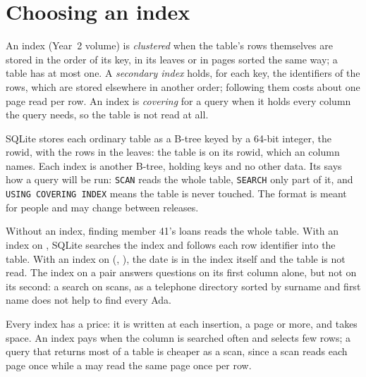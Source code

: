 \section{Choosing an index}\label{sec:b3:database-storage:choosing}

\begin{definition}\label{def:b3:database-storage:index}
An index (Year~2 volume) is \emph{clustered} when the table's rows themselves are stored in the order of its key, in its leaves or in pages sorted the same way; a table has at most one. A \emph{secondary index} holds, for each key, the identifiers of the rows, which are stored elsewhere in another order; following them costs about one page read per row. An index is \emph{covering} for a query when it holds every column the query needs, so the table is not read at all.
\end{definition}

SQLite stores each ordinary table as a B-tree keyed by a 64-bit integer, the rowid, with the rows in the leaves: the table is  on its rowid, which an  column names. Each index is another B-tree, holding keys and no other data. %
Its  says how a query will be run: \texttt{SCAN} reads the whole table, \texttt{SEARCH} only part of it, and \texttt{USING COVERING INDEX} means the table is never touched. The format is meant for people and may change between releases. %

\label{out:b3:database-storage:plan}

Without an index, finding member 41's loans reads the whole table. With an index on , SQLite searches the index and follows each row identifier into the table. With an index on (, ), the date is in the index itself and the table is not read. The index on a pair answers questions on its first column alone, but not on its second: a search on  scans, as a telephone directory sorted by surname and first name does not help to find every Ada.

Every index has a price: it is written at each insertion, a page or more, and takes space. An index pays when the column is searched often and selects few rows; a query that returns most of a table is cheaper as a scan, since a scan reads each page once while a  may read the same page once per row.

